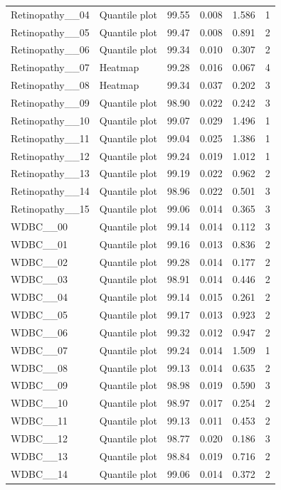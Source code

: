 \begin{longtable}{llrrrr}
Retinopathy\_\_04 & Quantile plot & 99.55 & 0.008 & 1.586 & 1\\
Retinopathy\_\_05 & Quantile plot & 99.47 & 0.008 & 0.891 & 2\\
Retinopathy\_\_06 & Quantile plot & 99.34 & 0.010 & 0.307 & 2\\
Retinopathy\_\_07 & Heatmap & 99.28 & 0.016 & 0.067 & 4\\
Retinopathy\_\_08 & Heatmap & 99.34 & 0.037 & 0.202 & 3\\
Retinopathy\_\_09 & Quantile plot & 98.90 & 0.022 & 0.242 & 3\\
Retinopathy\_\_10 & Quantile plot & 99.07 & 0.029 & 1.496 & 1\\
Retinopathy\_\_11 & Quantile plot & 99.04 & 0.025 & 1.386 & 1\\
Retinopathy\_\_12 & Quantile plot & 99.24 & 0.019 & 1.012 & 1\\
Retinopathy\_\_13 & Quantile plot & 99.19 & 0.022 & 0.962 & 2\\
Retinopathy\_\_14 & Quantile plot & 98.96 & 0.022 & 0.501 & 3\\
Retinopathy\_\_15 & Quantile plot & 99.06 & 0.014 & 0.365 & 3\\
WDBC\_\_00 & Quantile plot & 99.14 & 0.014 & 0.112 & 3\\
WDBC\_\_01 & Quantile plot & 99.16 & 0.013 & 0.836 & 2\\
WDBC\_\_02 & Quantile plot & 99.28 & 0.014 & 0.177 & 2\\
WDBC\_\_03 & Quantile plot & 98.91 & 0.014 & 0.446 & 2\\
WDBC\_\_04 & Quantile plot & 99.14 & 0.015 & 0.261 & 2\\
WDBC\_\_05 & Quantile plot & 99.17 & 0.013 & 0.923 & 2\\
WDBC\_\_06 & Quantile plot & 99.32 & 0.012 & 0.947 & 2\\
WDBC\_\_07 & Quantile plot & 99.24 & 0.014 & 1.509 & 1\\
WDBC\_\_08 & Quantile plot & 99.13 & 0.014 & 0.635 & 2\\
WDBC\_\_09 & Quantile plot & 98.98 & 0.019 & 0.590 & 3\\
WDBC\_\_10 & Quantile plot & 98.97 & 0.017 & 0.254 & 2\\
WDBC\_\_11 & Quantile plot & 99.13 & 0.011 & 0.453 & 2\\
WDBC\_\_12 & Quantile plot & 98.77 & 0.020 & 0.186 & 3\\
WDBC\_\_13 & Quantile plot & 98.84 & 0.019 & 0.716 & 2\\
WDBC\_\_14 & Quantile plot & 99.06 & 0.014 & 0.372 & 2\\

\end{longtable}
